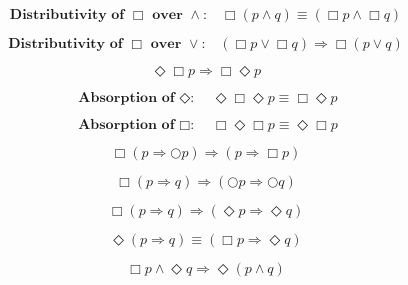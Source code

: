 \documentclass[fleqn, leqno]{article}
\newcommand{\spacer}{\vspace{-30pt}}
\begin{document}
\spacer

\begin{equation}\label{E:distAlwaysAnd}
\textbf{Distributivity of $\Box$ over $\land$:}\quad \Box (p \land q) \equiv (\Box p \land \Box q)
\end{equation}

\spacer

\begin{equation}\label{E:distAlwaysOr}
\textbf{Distributivity of $\Box$ over $\lor$:}\quad (\Box p \lor \Box q) \Rightarrow \Box (p \lor q)
\end{equation}

\spacer

\begin{equation}\label{E:eventAlwaysImp}
\Diamond\Box p \Rightarrow \Box\Diamond p
\end{equation}

\spacer

\begin{equation}\label{E:absEvent}
\textbf{Absorption of $\Diamond$:}\quad \Diamond\Box\Diamond p \equiv \Box\Diamond p
\end{equation}

\spacer

\begin{equation}\label{E:absAlways}
\textbf{Absorption of $\Box$:}\quad \Box\Diamond\Box p \equiv \Diamond\Box p
\end{equation}

\spacer

\begin{equation}\label{E:alwaysImpNext}
\Box (p \Rightarrow \bigcirc p) \Rightarrow (p \Rightarrow \Box p)
\end{equation}

\spacer

\begin{equation}\label{E:alwaysImpNexts}
\Box (p \Rightarrow q) \Rightarrow (\bigcirc p \Rightarrow \bigcirc q)
\end{equation}

\spacer

\begin{equation}\label{E:alwaysImpEvents}
\Box (p \Rightarrow q) \Rightarrow (\Diamond p \Rightarrow \Diamond q)
\end{equation}

\spacer

\begin{equation}\label{E:eventImpAlways}
\Diamond (p \Rightarrow q) \equiv (\Box p \Rightarrow \Diamond q)
\end{equation}

\spacer

\begin{equation}\label{E:alwaysAndEvent}
\Box p \land \Diamond q \Rightarrow \Diamond (p \land q)
\end{equation}
\end{document}
